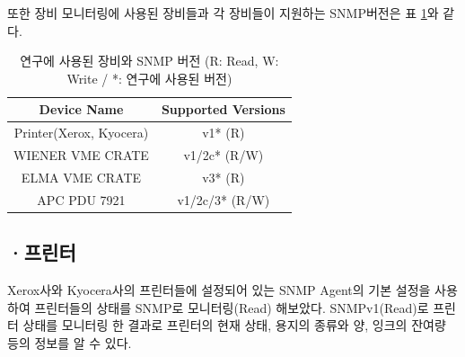 \documentclass[11pt
  , a4paper
  , article
  , oneside
]{memoir}
\begin{document}
또한 장비 모니터링에 사용된 장비들과 각 장비들이 지원하는 SNMP버전은 표 \ref{table:used_version}와 같다.

\begin{table}[h]
\begin{center}
\begin{tabular}{c|c}\hline
Device Name & Supported Versions \\ \hline
Printer(Xerox, Kyocera) & v1* (R) \\ \hline
WIENER VME CRATE & v1/2c* (R/W) \\ \hline
ELMA VME CRATE & v3* (R) \\ \hline
APC PDU 7921 & v1/2c/3* (R/W) \\ \hline
\end{tabular}
\caption{연구에 사용된 장비와 SNMP 버전 (R: Read, W: Write / *: 연구에 사용된 버전)}
  \label{table:used_version}  
\end{center}
\end{table} 

\clearpage
\subsection{·프린터}

Xerox사와 Kyocera사의 프린터들에 설정되어 있는 SNMP Agent의 기본 설정을 사용하여 프린터들의 상태를 SNMP로 모니터링(Read) 해보았다. SNMPv1(Read)로 프린터 상태를 모니터링 한 결과로 프린터의 현재 상태, 용지의 종류와 양, 잉크의 잔여량 등의 정보를 알 수 있다.
\end{document}
